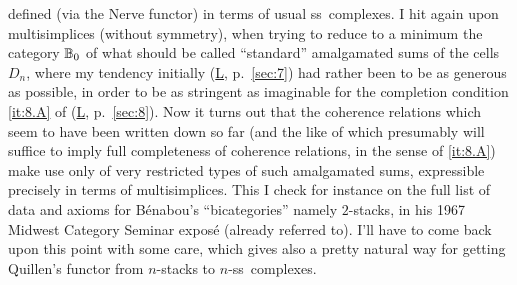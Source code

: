 defined (via the Nerve functor) in terms of usual ss~complexes. I hit
again upon multisimplices (without symmetry), when trying to reduce to
a minimum the category ${\mathbb{B}}_0$ of what should be called ``standard''
amalgamated sums of the cells $D_n$, where my tendency initially
(\hyperref[ch:I]L, p.\ \ref{sec:7}) had rather been to be as generous
as possible, in order to be as stringent as imaginable for the
completion condition \ref{it:8.A} of (\hyperref[ch:I]L, p.\
\ref{sec:8}).  Now it turns out that the coherence relations which
seem to have been written down so far (and the like of which
presumably will suffice to imply full completeness of coherence
relations, in the sense of \ref{it:8.A}) make use only of very
restricted types of such amalgamated sums, expressible precisely in
terms of multisimplices. This I check for instance on the full list of
data and axioms for B\'enabou's ``bicategories'' namely $2$-stacks, in
his 1967 Midwest Category Seminar expos\'e (already referred to). I'll
have to come back upon this point with some care, which gives also a
pretty natural way for getting Quillen's functor from $n$-stacks to
$n$-ss~complexes.

